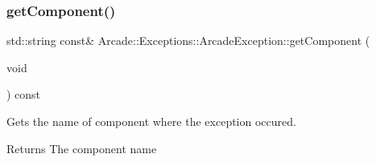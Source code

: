 \subsubsection{\texorpdfstring{getComponent()}{getComponent()}}
{\footnotesize\ttfamily std\+::string const\& Arcade\+::\+Exceptions\+::\+Arcade\+Exception\+::get\+Component (\begin{DoxyParamCaption}\item[{void}]{ }\end{DoxyParamCaption}) const\hspace{0.3cm}{\ttfamily [noexcept]}}



Gets the name of component where the exception occured. 

\begin{DoxyReturn}{Returns}
The component name 
\end{DoxyReturn}
